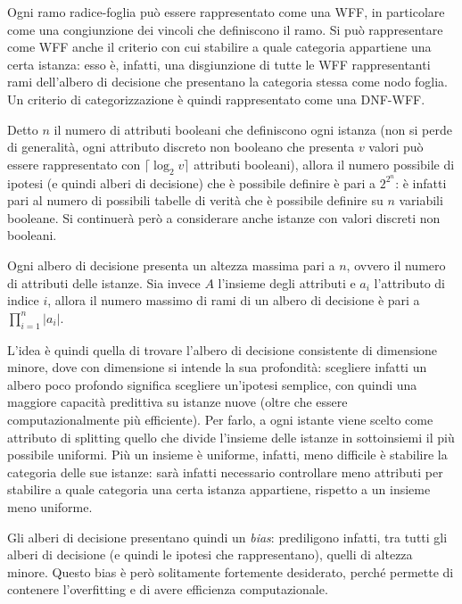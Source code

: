 Ogni ramo radice-foglia può essere rappresentato come una WFF, in particolare come una congiunzione dei vincoli che definiscono il ramo. Si può rappresentare come WFF anche il criterio con cui stabilire a quale categoria appartiene una certa istanza: esso è, infatti, una disgiunzione di tutte le WFF rappresentanti rami dell'albero di decisione che presentano la categoria stessa come nodo foglia. Un criterio di categorizzazione è quindi rappresentato come una DNF-WFF.

Detto $n$ il numero di attributi booleani che definiscono ogni istanza (non si perde di generalità, ogni attributo discreto non booleano che presenta $v$ valori può essere rappresentato con $\lceil \log_2 v \rceil$ attributi booleani), allora il numero possibile di ipotesi (e quindi alberi di decisione) che è possibile definire è pari a $2^{2^n}$: è infatti pari al numero di possibili tabelle di verità che è possibile definire su $n$ variabili booleane.
Si continuerà però a considerare anche istanze con valori discreti non booleani.

Ogni albero di decisione presenta un altezza massima pari a $n$, ovvero il numero di attributi delle istanze.
Sia invece $A$ l'insieme degli attributi e $a_i$ l'attributo di indice $i$, allora il numero massimo di rami di un albero di decisione è pari a $\prod_{i=1}^{n} |a_i|$.

L'idea è quindi quella di trovare l'albero di decisione consistente di dimensione minore, dove con dimensione si intende la sua profondità: scegliere infatti un albero poco profondo significa scegliere un'ipotesi semplice, con quindi una maggiore capacità predittiva su istanze nuove (oltre che essere computazionalmente più efficiente).
Per farlo, a ogni istante viene scelto come attributo di splitting quello che divide l'insieme delle istanze in sottoinsiemi il più possibile uniformi. Più un insieme è uniforme, infatti, meno difficile è stabilire la categoria delle sue istanze: sarà infatti necessario controllare meno attributi per stabilire a quale categoria una certa istanza appartiene, rispetto a un insieme meno uniforme.

Gli alberi di decisione presentano quindi un \textit{bias}: prediligono infatti, tra tutti gli alberi di decisione (e quindi le ipotesi che rappresentano), quelli di altezza minore. Questo bias è però solitamente fortemente desiderato, perché permette di contenere l'overfitting e di avere efficienza computazionale.

